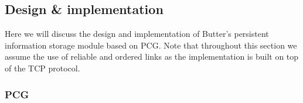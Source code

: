 %
%
%
%

\subsection{Design \& implementation}

Here we will discuss the design and implementation of Butter's persistent information storage module based on PCG. Note that throughout this section we assume the use of reliable and ordered links as the implementation is built on top of the TCP protocol.

\subsubsection{PCG}

